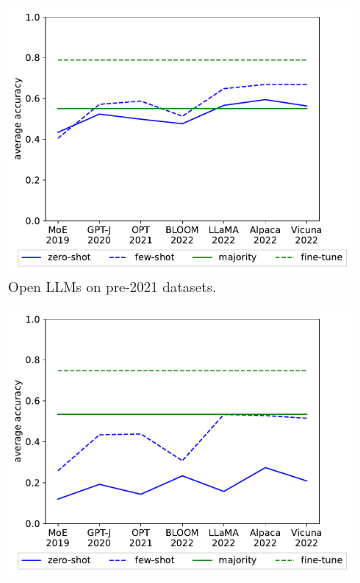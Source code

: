 \documentclass[letterpaper]{article} %
\begin{document}
\begin{figure}[t]
\begin{subfigure}[b]{0.475\textwidth}
            \label{fig:GPT-new-datasets}
        \end{subfigure}
        \begin{subfigure}[b]{0.475\textwidth}
            \centering
            \includegraphics[scale=0.45]{img/output-zero-few-shot-old-dataset-recent-llm.pdf}
            \caption[]%
            {{Open LLMs on pre-2021 datasets.}}    
            \label{fig:Open-old-datasets}
        \end{subfigure}
        \begin{subfigure}[b]{0.475\textwidth}   
            \centering 
            \includegraphics[scale=0.45]{img/output-zero-few-shot-new-dataset-recent-llm.pdf}

\end{subfigure}
\end{figure}
\end{document}
